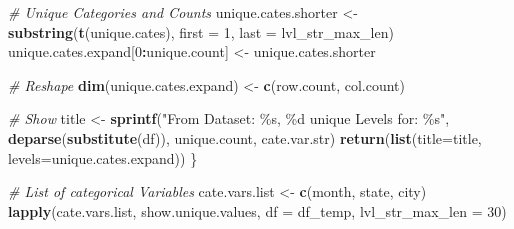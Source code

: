\documentclass[
]{book}
\newenvironment{Shaded}{\begin{snugshade}}{\end{snugshade}}
\newcommand{\CommentTok}[1]{\textcolor[rgb]{0.56,0.35,0.01}{\textit{#1}}}
\newcommand{\DataTypeTok}[1]{\textcolor[rgb]{0.13,0.29,0.53}{#1}}
\newcommand{\DecValTok}[1]{\textcolor[rgb]{0.00,0.00,0.81}{#1}}
\newcommand{\KeywordTok}[1]{\textcolor[rgb]{0.13,0.29,0.53}{\textbf{#1}}}
\newcommand{\NormalTok}[1]{#1}
\newcommand{\OperatorTok}[1]{\textcolor[rgb]{0.81,0.36,0.00}{\textbf{#1}}}
\newcommand{\StringTok}[1]{\textcolor[rgb]{0.31,0.60,0.02}{#1}}
\begin{document}
\begin{Shaded}
\begin{Highlighting}[]
    \CommentTok{\# Unique Categories and Counts}
\NormalTok{    unique.cates.shorter \textless{}{-}}\StringTok{ }\KeywordTok{substring}\NormalTok{(}\KeywordTok{t}\NormalTok{(unique.cates), }\DataTypeTok{first =} \DecValTok{1}\NormalTok{, }\DataTypeTok{last =}\NormalTok{ lvl\_str\_max\_len)}
\NormalTok{    unique.cates.expand[}\DecValTok{0}\OperatorTok{:}\NormalTok{unique.count] \textless{}{-}}\StringTok{ }\NormalTok{unique.cates.shorter}

    \CommentTok{\# Reshape}
    \KeywordTok{dim}\NormalTok{(unique.cates.expand) \textless{}{-}}\StringTok{ }\KeywordTok{c}\NormalTok{(row.count, col.count)}

    \CommentTok{\# Show}
\NormalTok{    title \textless{}{-}}\StringTok{ }\KeywordTok{sprintf}\NormalTok{(}\StringTok{"From Dataset: \%s, \%d unique Levels for: \%s"}\NormalTok{,}
                     \KeywordTok{deparse}\NormalTok{(}\KeywordTok{substitute}\NormalTok{(df)), unique.count, cate.var.str)}
    \KeywordTok{return}\NormalTok{(}\KeywordTok{list}\NormalTok{(}\DataTypeTok{title=}\NormalTok{title,}
           \DataTypeTok{levels=}\NormalTok{unique.cates.expand))}
\NormalTok{\}}
\end{Highlighting}
\end{Shaded}

\begin{Shaded}
\begin{Highlighting}[]
\CommentTok{\# List of categorical Variables}
\NormalTok{cate.vars.list \textless{}{-}}\StringTok{ }\KeywordTok{c}\NormalTok{(}\StringTok{\textquotesingle{}month\textquotesingle{}}\NormalTok{, }\StringTok{\textquotesingle{}state\textquotesingle{}}\NormalTok{, }\StringTok{\textquotesingle{}city\textquotesingle{}}\NormalTok{)}
\KeywordTok{lapply}\NormalTok{(cate.vars.list, show.unique.values, }\DataTypeTok{df =}\NormalTok{ df\_temp, }\DataTypeTok{lvl\_str\_max\_len =} \DecValTok{30}\NormalTok{)}
\end{Highlighting}
\end{Shaded}
\end{document}

